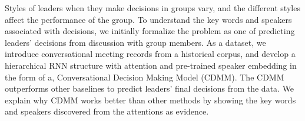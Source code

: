 Styles of leaders when they make decisions in groups vary, and the different styles affect the performance of the group. To understand the key words and speakers associated with decisions, we initially formalize the problem as one of predicting leaders' decisions from discussion with group members. As a dataset, we introduce conversational meeting records from a historical corpus, and develop a hierarchical RNN structure with attention and pre-trained speaker embedding in the form of a, Conversational Decision Making Model (CDMM). The CDMM outperforms other baselines to predict leaders' final decisions from the data. We explain why CDMM works better than other methods by showing the key words and speakers discovered from the attentions as evidence.
